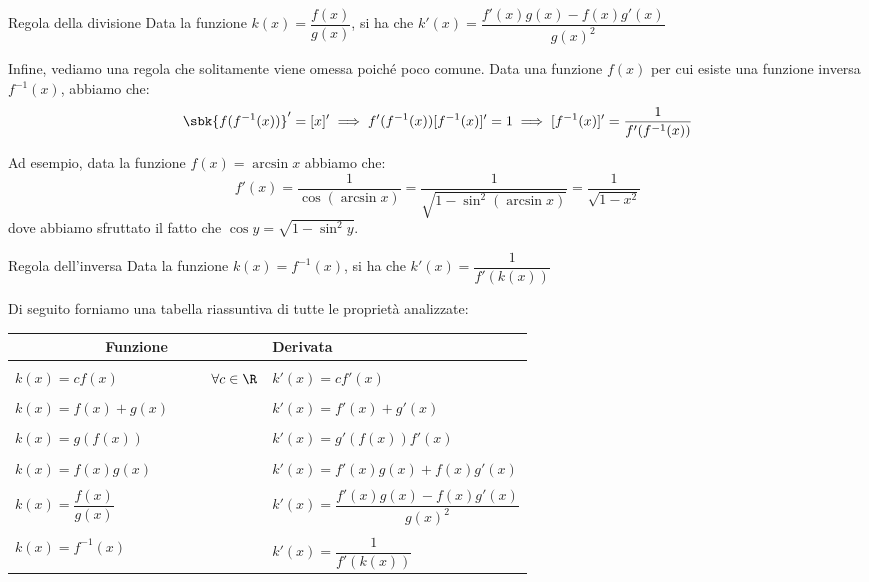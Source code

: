 \documentclass[a4paper, 12pt]{report}
\begin{document}
    \begin{framedprop}{Regola della divisione}
        Data la funzione $k(x) = \dfrac{f(x)}{g(x)}$, si ha che $k'(x) = \dfrac{f'(x)g(x)-f(x)g'(x)}{g(x)^2}$
    \end{framedprop}

    Infine, vediamo una regola che solitamente viene omessa poiché poco comune. Data una funzione $f(x)$ per cui esiste una funzione inversa $f^{-1}(x)$, abbiamo che:
    \[\sbk{f(f^{-1}(x))}' = [x]' \implies f'(f^{-1}(x))[f^{-1}(x)]'= 1 \implies [f^{-1}(x)]' = \frac{1}{f'(f^{-1}(x))}\]

    Ad esempio, data la funzione $f(x) = \arcsin x$ abbiamo che:
    \[f'(x) = \frac{1}{\cos(\arcsin x)} = \frac{1}{\sqrt{1-\sin^2(\arcsin x)}} = \frac{1}{\sqrt{1-x^2}}\]
    dove abbiamo sfruttato il fatto che $\cos y = \sqrt{1-\sin^2 y}$.

    \begin{framedprop}{Regola dell'inversa}
        Data la funzione $k(x) = f^{-1}(x)$, si ha che $k'(x) = \dfrac{1}{f'(k(x))}$
    \end{framedprop}

    Di seguito forniamo una tabella riassuntiva di tutte le proprietà analizzate:
    \begin{center}
        \begin{tabular}{lr|l}
            \multicolumn{2}{c}{\textbf{Funzione}} & \textbf{Derivata} \\
            \hline
            &&\\
            $k(x) = cf(x)$ & $\qquad \forall c \in \R$ & $k'(x) = cf'(x)$ \\
            &&\\
            $k(x) = f(x)+g(x) $ & & $k'(x) = f'(x)+g'(x)$ \\
            &&\\
            $k(x) = g(f(x)) $ & & $k'(x) = g'(f(x))f'(x)$ \\
            &&\\
            $k(x) = f(x)g(x)$ &  & $k'(x) = f'(x)g(x)+f(x)g'(x)$ \\
            &&\\
            $k(x) = \dfrac{f(x)}{g(x)} $ & & $k'(x) = \dfrac{f'(x)g(x)-f(x)g'(x)}{g(x)^2}$ \\
            &&\\
            $k(x) = f^{-1}(x)$ & &$k'(x) = \dfrac{1}{f'(k(x))}$ 
        \end{tabular}
    \end{center}
\end{document}
